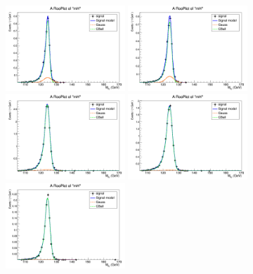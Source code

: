 \begin{figure}[htb]
	\begin{center}
		\includegraphics[width=0.40\textwidth]{fig/signal_fit/2018/sigfit_ele_ggF_1_125.png}
		\includegraphics[width=0.40\textwidth]{fig/signal_fit/2018/sigfit_ele_ggF_2_125.png}\\
		\includegraphics[width=0.40\textwidth]{fig/signal_fit/2018/sigfit_ele_ggF_3_125.png}
		\includegraphics[width=0.40\textwidth]{fig/signal_fit/2018/sigfit_ele_ggF_4_125.png}\\
		\includegraphics[width=0.40\textwidth]{fig/signal_fit/2018/sigfit_ele_VBF_501_125.png}

\end{center}
\end{figure}
